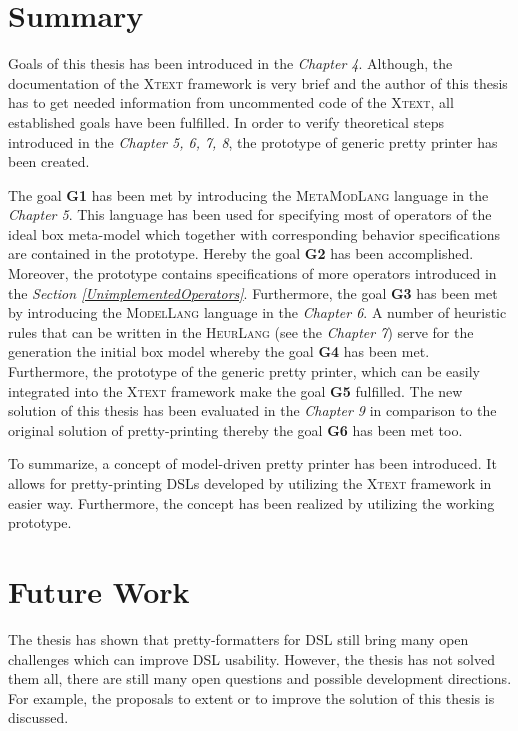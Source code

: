 \documentclass[12pt,notitlepage,a4paper]{report}
\begin{document}
\section{Summary}

Goals of this thesis has been introduced in the \textit{Chapter 4}. Although, the documentation of the \textsc{Xtext} framework \cite{Xtext} is very brief and the author of this thesis has to get needed information from uncommented code of the \textsc{Xtext}, all established goals have been fulfilled. In order to verify theoretical steps introduced in the \textit{Chapter 5, 6, 7, 8}, the prototype of generic pretty printer has been created.

The goal \textbf{G1} has been met by introducing the \textsc{MetaModLang} language in the \textit{Chapter 5}. This language has been used for specifying most of operators of the ideal box meta-model which together with corresponding behavior specifications are contained in the prototype. Hereby the goal \textbf{G2} has been accomplished. Moreover, the prototype contains specifications of more operators introduced in the \textit{Section \ref{UnimplementedOperators}}. Furthermore, the goal \textbf{G3} has been met by introducing the \textsc{ModelLang} language in the \textit{Chapter 6}. A number of heuristic rules that can be written in the \textsc{HeurLang} (see the \textit{Chapter 7}) serve for the generation the initial box model whereby the goal \textbf{G4} has been met. Furthermore, the prototype of the generic pretty printer, which can be easily integrated into the \textsc{Xtext} framework make the goal \textbf{G5} fulfilled. The new solution of this thesis has been evaluated in the \textit{Chapter 9} in comparison to the original solution of pretty-printing thereby the goal \textbf{G6} has been met too.

To summarize, a concept of model-driven pretty printer has been introduced. It allows for pretty-printing DSLs developed by utilizing the \textsc{Xtext} framework in easier way. Furthermore, the concept has been realized by utilizing the working prototype.

\section{Future Work}
The thesis has shown that pretty-formatters for DSL still bring many open challenges which can improve DSL usability. However, the thesis has not solved them all, there are still many open questions and possible development directions. For example, the proposals to extent or to improve the solution of this thesis is discussed.
\end{document}

